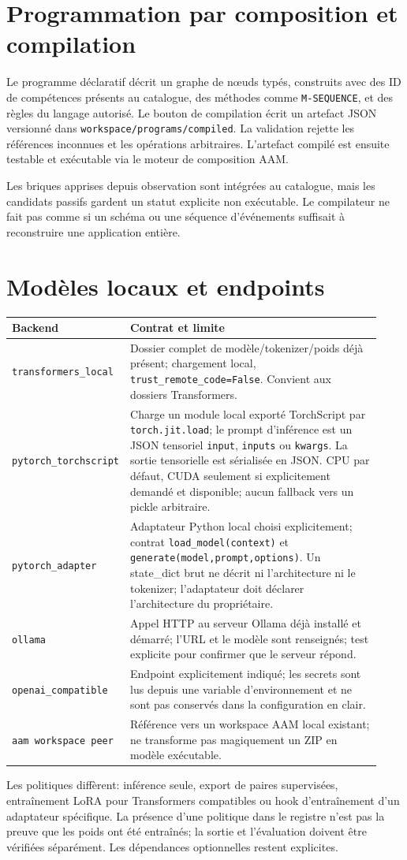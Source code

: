 \documentclass[11pt,a4paper]{article}
\begin{document}
\section{Programmation par composition et compilation}
Le programme déclaratif décrit un graphe de nœuds typés, construits avec des ID de compétences présents au catalogue, des méthodes comme \texttt{M-SEQUENCE}, et des règles du langage autorisé. Le bouton de compilation écrit un artefact JSON versionné dans \texttt{workspace/programs/compiled}. La validation rejette les références inconnues et les opérations arbitraires. L'artefact compilé est ensuite testable et exécutable via le moteur de composition AAM.

Les briques apprises depuis observation sont intégrées au catalogue, mais les candidats passifs gardent un statut explicite non exécutable. Le compilateur ne fait pas comme si un schéma ou une séquence d'événements suffisait à reconstruire une application entière.

\section{Modèles locaux et endpoints}
\begin{longtable}{p{0.21\linewidth}p{0.72\linewidth}}
\toprule Backend & Contrat et limite \tabularnewline
\midrule
\texttt{transformers\_local} & Dossier complet de modèle/tokenizer/poids déjà présent; chargement local, \texttt{trust\_remote\_code=False}. Convient aux dossiers Transformers. \tabularnewline
\texttt{pytorch\_torchscript} & Charge un module local exporté TorchScript par \texttt{torch.jit.load}; le prompt d'inférence est un JSON tensoriel \texttt{input}, \texttt{inputs} ou \texttt{kwargs}. La sortie tensorielle est sérialisée en JSON. CPU par défaut, CUDA seulement si explicitement demandé et disponible; aucun fallback vers un pickle arbitraire. \tabularnewline
\texttt{pytorch\_adapter} & Adaptateur Python local choisi explicitement; contrat \texttt{load\_model(context)} et \texttt{generate(model,prompt,options)}. Un state\_dict brut ne décrit ni l'architecture ni le tokenizer; l'adaptateur doit déclarer l'architecture du propriétaire. \tabularnewline
\texttt{ollama} & Appel HTTP au serveur Ollama déjà installé et démarré; l'URL et le modèle sont renseignés; test explicite pour confirmer que le serveur répond. \tabularnewline
\texttt{openai\_compatible} & Endpoint explicitement indiqué; les secrets sont lus depuis une variable d'environnement et ne sont pas conservés dans la configuration en clair. \tabularnewline
\texttt{aam workspace peer} & Référence vers un workspace AAM local existant; ne transforme pas magiquement un ZIP en modèle exécutable. \tabularnewline
\bottomrule
\end{longtable}
Les politiques diffèrent: inférence seule, export de paires supervisées, entraînement LoRA pour Transformers compatibles ou hook d'entraînement d'un adaptateur spécifique. La présence d'une politique dans le registre n'est pas la preuve que les poids ont été entraînés; la sortie et l'évaluation doivent être vérifiées séparément. Les dépendances optionnelles restent explicites.
\end{document}
